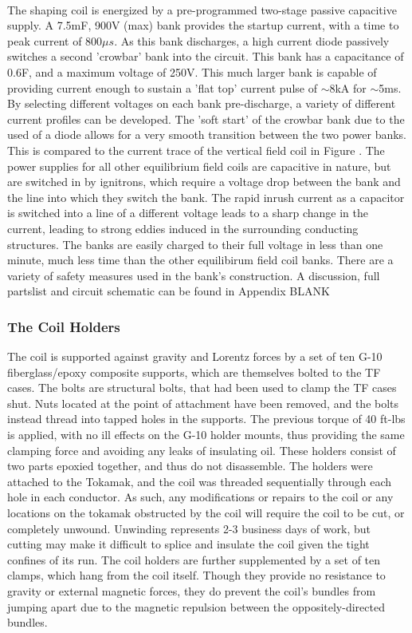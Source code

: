\paragraph{}The shaping coil is energized by a pre-programmed two-stage passive capacitive supply.  A 7.5mF, 900V (max) bank provides the startup current, with a time to peak current of $800\mu s$.  As this bank discharges, a high current diode passively switches a second 'crowbar' bank into the circuit.  This bank has a capacitance of 0.6F, and a maximum voltage of 250V.  This much larger bank is capable of providing current enough to sustain a 'flat top' current pulse of $\sim$8kA for $\sim$5ms.  By selecting different voltages on each bank pre-discharge, a variety of different current profiles can be developed.  The 'soft start' of the crowbar bank due to the used of a diode allows for a very smooth transition between the two power banks.  This is compared to the current trace of the vertical field coil in Figure .  The power supplies for all other equilibrium field coils are capacitive in nature, but are switched in by ignitrons, which require a voltage drop between the bank and the line into which they switch the bank.  The rapid inrush current as a capacitor is switched into a line of a different voltage leads to a sharp change in the current, leading to strong eddies induced in the surrounding conducting structures.  The banks are easily charged to their full voltage in less than one minute, much less time than the other equilibirum field coil banks.  There are a variety of safety measures used in the bank's construction.  A discussion, full partslist and circuit schematic can be found in Appendix BLANK
\subsubsection{The Coil Holders}
The coil is supported against gravity and Lorentz forces by a set of ten  G-10 fiberglass/epoxy composite supports, which are themselves bolted to the TF cases.  The bolts are structural bolts, that had been used to clamp the TF cases shut.  Nuts located at the point of attachment have been removed, and the bolts instead thread into tapped holes in the supports.  The previous torque of 40 ft-lbs is applied, with no ill effects on the G-10 holder mounts, thus providing the same clamping force and avoiding any leaks of insulating oil.
These holders consist of two parts epoxied together, and thus do not disassemble.  The holders were attached to the Tokamak, and the coil was threaded sequentially through each hole in each conductor.  As such, any modifications or repairs to the coil or any locations on the tokamak obstructed by the coil will require the coil to be cut, or completely unwound.  Unwinding represents 2-3 business days of work, but cutting may make it difficult to splice and insulate the coil given the tight confines of its run.
The coil holders are further supplemented by a set of ten clamps, which hang from the coil itself.  Though they provide no resistance to gravity or external magnetic forces, they do prevent the coil's bundles from jumping apart due to the magnetic repulsion between the oppositely-directed bundles.
